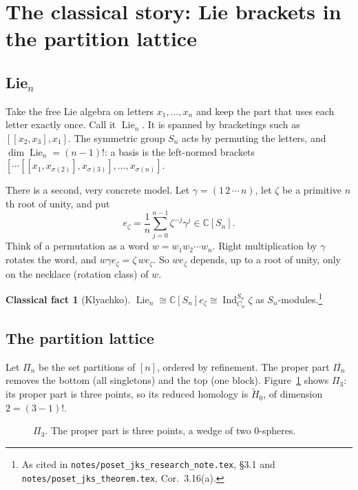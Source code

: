 \documentclass[11pt]{article}
\theoremstyle{definition}
\newtheorem{fact}{Classical fact}
\theoremstyle{remark}
\newcommand{\Lie}{\operatorname{Lie}}
\newcommand{\Ind}{\operatorname{Ind}}
\newcommand{\src}[1]{\nolinkurl{#1}}
\newcommand{\tagbox}[1]{\leavevmode\marginpar{\raggedright\fbox{\parbox{0.66in}{\centering\scriptsize\sffamily #1}}}}
\newcommand{\CITED}{\tagbox{CLASSICAL\\(CITED)}}
\begin{document}
\section{The classical story: Lie brackets in the partition lattice}

\subsection{Lie\texorpdfstring{$_n$}{n}}

Take the free Lie algebra on letters $x_1,\dots,x_n$ and keep the part that
uses each letter exactly once. Call it $\Lie_n$. It is spanned by bracketings
such as $[[x_2,x_3],x_1]$. The symmetric group $S_n$ acts by permuting the
letters, and $\dim\Lie_n=(n-1)!$: a basis is the left-normed brackets
$[\cdots[[x_1,x_{\sigma(2)}],x_{\sigma(3)}],\dots,x_{\sigma(n)}]$.

There is a second, very concrete model. Let $\gamma=(1\,2\,\cdots\,n)$, let
$\zeta$ be a primitive $n$th root of unity, and put
\[
e_\zeta=\frac1n\sum_{j=0}^{n-1}\zeta^{-j}\gamma^j\in\mathbb C[S_n].
\]
Think of a permutation as a word $w=w_1w_2\cdots w_n$. Right multiplication
by $\gamma$ rotates the word, and $w\gamma e_\zeta=\zeta\,we_\zeta$. So
$we_\zeta$ depends, up to a root of unity, only on the necklace (rotation
class) of $w$.

\begin{fact}[Klyachko]\CITED
$\Lie_n\cong\mathbb C[S_n]e_\zeta\cong\Ind_{C_n}^{S_n}\zeta$ as
$S_n$-modules.\footnote{As cited in \src{notes/poset_jks_research_note.tex},
\S3.1 and \src{notes/poset_jks_theorem.tex}, Cor.~3.16(a).}
\end{fact}

\subsection{The partition lattice}

Let $\Pi_n$ be the set partitions of $[n]$, ordered by refinement. The proper
part $\overline{\Pi_n}$ removes the bottom (all singletons) and the top (one
block). Figure~\ref{fig:pi3} shows $\Pi_3$: its proper part is three points,
so its reduced homology is $\widetilde H_0$, of dimension $2=(3-1)!$.

\begin{figure}[ht]
\centering
{}
\caption{$\Pi_3$. The proper part is three points, a wedge of two
$0$-spheres.}\label{fig:pi3}
\end{figure}
\end{document}
